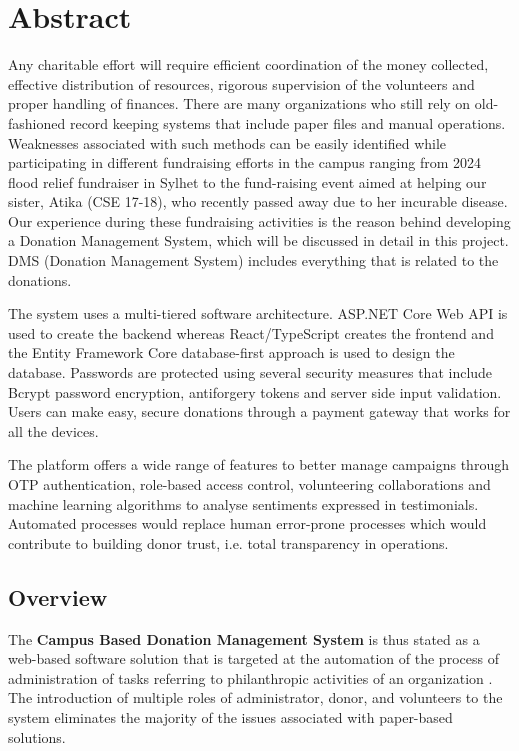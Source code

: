 \documentclass{thesis-library}
\begin{document}
\chapter*{Abstract}
Any charitable effort will require efficient coordination of the money collected, effective distribution of resources, rigorous supervision of the volunteers and proper handling of finances. There are many organizations who still rely on old-fashioned record keeping systems that include paper files and manual operations. Weaknesses associated with such methods can be easily identified while participating in different fundraising efforts in the campus ranging from 2024 flood relief fundraiser in Sylhet to the fund-raising event aimed at helping our sister, Atika (CSE 17-18), who recently passed away due to her incurable disease. Our experience during these fundraising activities is the reason behind developing a Donation Management System, which will be discussed in detail in this project. DMS (Donation Management System) includes everything that is related to the donations.

The system uses a multi-tiered software architecture. ASP.NET Core Web API is used to create the backend whereas React/TypeScript creates the frontend and the Entity Framework Core database-first approach is used to design the database. Passwords are protected using several security measures that include Bcrypt password encryption, antiforgery tokens and server side input validation. Users can make easy, secure donations through a payment gateway that works for all the devices.

The platform offers a wide range of features to better manage campaigns through OTP authentication, role-based access control, volunteering collaborations and machine learning algorithms to analyse sentiments expressed in testimonials. Automated processes would replace human error-prone processes which would contribute to building donor trust, i.e. total transparency in operations.


\newpage
{}

\newpage
\section{Overview}
The \textbf{Campus Based Donation Management System} is thus stated as a web-based software solution that is targeted at the automation of the process of administration of tasks referring to philanthropic activities of an organization \cite{robinson2019digital,sander2021digital}. The introduction of multiple roles of administrator, donor, and volunteers to the system eliminates the majority of the issues associated with paper-based solutions.
\end{document}
